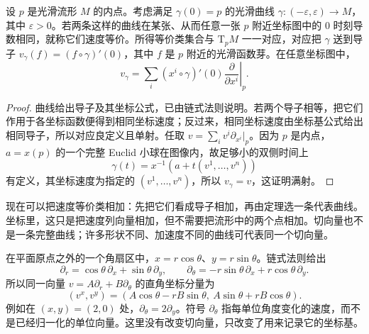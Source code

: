 \begin{theorem}
	\label{g1:thm:tangent-curve-derivation}
	设 \(p\) 是光滑流形 \(M\) 的内点。考虑满足 \(\gamma(0)=p\) 的光滑曲线 \(\gamma:(-\varepsilon,\varepsilon)\to M\)，其中 \(\varepsilon>0\)。若两条这样的曲线在某张、从而任意一张 \(p\) 附近坐标图中的 \(0\) 时刻导数相同，就称它们速度等价。所得等价类集合与 \(\mathrm{T}_pM\) 一一对应，对应把 \(\gamma\) 送到导子 \(v_\gamma(f)=(f\circ\gamma)'(0)\)，其中 \(f\) 是 \(p\) 附近的光滑函数芽。在任意坐标图中，
	\[
		v_\gamma=\sum_i(x^i\circ\gamma)'(0)
		\left.\frac{\partial}{\partial x^i}\right|_p.
	\]
\end{theorem}
\begin{proof}
	曲线给出导子及其坐标公式，已由链式法则说明。若两个导子相等，把它们作用于各坐标函数便得到相同坐标速度；反过来，相同坐标速度由坐标基公式给出相同导子，所以对应良定义且单射。任取 \(v=\sum_i v^i\partial_{x^i}|_p\)。因为 \(p\) 是内点，\(a=x(p)\) 的一个完整 Euclid 小球在图像内，故足够小的双侧时间上
	\[
		\gamma(t)=x^{-1}(a+t(v^1,\ldots,v^n))
	\]
	有定义，其坐标速度为指定的 \((v^1,\ldots,v^n)\)，所以 \(v_\gamma=v\)，这证明满射。
\end{proof}

现在可以把速度等价类相加：先把它们看成导子相加，再由定理选一条代表曲线。坐标里，这只是把速度列向量相加，但不需要把流形中的两个点相加。切向量也不是一条完整曲线；许多形状不同、加速度不同的曲线可代表同一个切向量。

\begin{example}
	\label{g1:exm:tangent-polar-coordinates}
	在平面原点之外的一个角扇区中，\(x=r\cos\theta\)、\(y=r\sin\theta\)。链式法则给出
	\[
		\partial_r=\cos\theta\,\partial_x+\sin\theta\,\partial_y,\qquad
		\partial_\theta=-r\sin\theta\,\partial_x+r\cos\theta\,\partial_y.
	\]
	所以同一向量 \(v=A\partial_r+B\partial_\theta\) 的直角坐标分量为
	\[
		(v^x,v^y)=(A\cos\theta-rB\sin\theta,\ A\sin\theta+rB\cos\theta).
	\]
	例如在 \((x,y)=(2,0)\) 处，\(\partial_\theta=2\partial_y\)。符号 \(\partial_\theta\) 指每单位角度变化的速度，而不是已经归一化的单位向量。这里没有改变切向量，只改变了用来记录它的坐标基。
\end{example}


